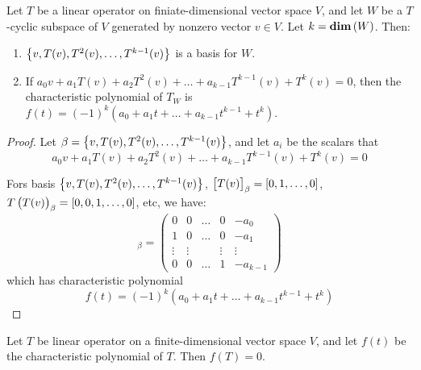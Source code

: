 \begin{theorem}
    Let $T$ be a linear operator on finiate-dimensional vector space $V$, and let $W$ be a $T$-cyclic subspace of $V$ generated by nonzero vector $v \in V$. Let $k = \displaystyle \mathbf{dim}\left( W \right)$. Then:
    \begin{enumerate}
        \item $\set{v, T(v), T^2(v), \dots, T^{k-1}(v)}$ is a basis for $W$.
        \item If $a_0 v + a_1 T(v) + a_2 T^2(v) + \dots + a_{k-1} T^{k-1}(v) + T^k(v) = 0$, then the characteristic polynomial of $T_W$ is $f(t) = (-1)^k \left( a_0 + a_1 t + \dots + a_{k-1} t^{k-1} + t^k \right)$.
    \end{enumerate}
\end{theorem}

\begin{proof}
    Let $\beta = \set{v, T(v), T^2(v), \dots, T^{k-1}(v)}$, and let $a_i$ be the scalars that 
    \begin{equation*}
            a_0 v + a_1 T(v) + a_2 T^2(v) + \dots + a_{k-1} T^{k-1}(v) + T^k(v) = 0
    \end{equation*}
    
    Fors basis $\set{v, T(v), T^2(v), \dots, T^{k-1}(v)}$, $\coordinate{T(v)}_\beta = \coordinate{0,1,\dots, 0}$, $T\left( T(v)\right)_\beta = \coordinate{0,0,1,\dots, 0}$, etc, we have:
    \begin{equation*}
        [T_W]_\beta = \begin{pmatrix}
            0 & 0 & \dots & 0 & - a_0 \\
            1 & 0 & \dots & 0 & -a_1\\
            \vdots & \vdots  & & \vdots & \vdots \\
            0 & 0 & \dots & 1 & - a_{k-1}
        \end{pmatrix}
    \end{equation*}
    which has characteristic polynomial
    \begin{equation*}
        f(t) = (-1)^k (a_0 + a_1 t + \dots + a_{k-1} t^{k-1} + t^k)
    \end{equation*}
\end{proof}

\begin{theorem}
    Let $T$ be linear operator on a finite-dimensional vector space $V$, and let $f(t)$ be the characteristic polynomial of $T$. Then $f(T) = 0$.
\end{theorem}

